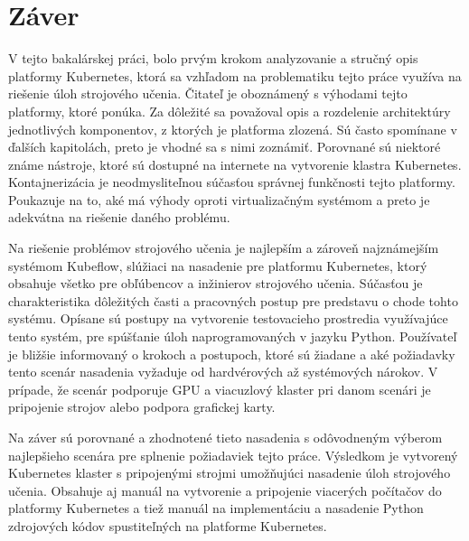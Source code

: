 
\chapter{Záver}
\label{summary}

V tejto bakalárskej práci, bolo prvým krokom analyzovanie a stručný opis platformy Kubernetes, ktorá sa vzhľadom na problematiku tejto práce využíva na riešenie úloh strojového učenia. Čitateľ je oboznámený s výhodami tejto platformy, ktoré ponúka. Za dôležité sa považoval opis a rozdelenie architektúry jednotlivých komponentov, z ktorých je platforma zlozená. Sú často spomínane v ďalších kapitolách, preto je vhodné sa s nimi zoznámiť. Porovnané sú niektoré známe nástroje, ktoré sú dostupné na internete na vytvorenie klastra Kubernetes. Kontajnerizácia je neodmysliteľnou súčasťou správnej funkčnosti tejto platformy. Poukazuje na to, aké má výhody oproti virtualizačným systémom a preto je adekvátna na riešenie daného problému.

Na riešenie problémov strojového učenia je najlepším a zároveň najznámejším systémom Kubeflow, slúžiaci na nasadenie pre platformu Kubernetes, ktorý obsahuje všetko pre obľúbencov a inžinierov strojového učenia. Súčasťou je charakteristika dôležitých časti a pracovných postup pre predstavu o chode tohto systému. Opísane sú postupy na vytvorenie testovacieho prostredia využívajúce tento systém, pre spúšťanie úloh naprogramovaných v jazyku Python. Používateľ je bližšie informovaný o krokoch a postupoch, ktoré sú žiadane a aké požiadavky tento scenár nasadenia vyžaduje od hardvérových až systémových nárokov. V prípade, že scenár podporuje GPU a viacuzlový klaster pri danom scenári je pripojenie strojov alebo podpora grafickej karty.

Na záver sú porovnané a zhodnotené tieto nasadenia s odôvodneným výberom najlepšieho scenára pre splnenie požiadaviek tejto práce. Výsledkom je vytvorený Kubernetes klaster s pripojenými strojmi umožňujúci nasadenie úloh strojového učenia. Obsahuje aj manuál na vytvorenie a pripojenie viacerých počítačov do platformy Kubernetes a tiež manuál na implementáciu a nasadenie Python zdrojových kódov spustiteľných na platforme Kubernetes.